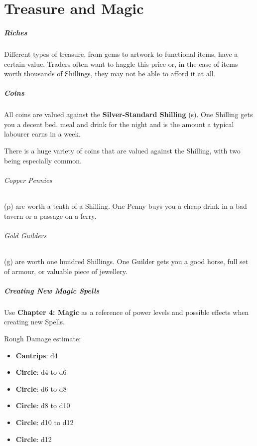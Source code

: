 \documentclass[itdr]{subfiles}
\begin{document}
\chapter{Treasure and Magic}
\label{ch:treasure_and_magic}

\paragraph{Riches}
Different types of treasure, from gems to artwork to functional items, have a certain value. Traders often want to haggle this price or, in the case of items worth thousands of Shillings, they may not be able to afford it at all.

\paragraph{Coins}
All coins are valued against the \textbf{Silver-Standard Shilling} (s). One Shilling gets you a decent bed, meal and drink for the night and is the amount a typical labourer earns in a week.

There is a huge variety of coins that are valued against the Shilling, with two being especially common.

\subparagraph{Copper Pennies} (p) are worth a tenth of a Shilling. One Penny buys you a cheap drink in a bad tavern or a passage on a ferry.

\subparagraph{Gold Guilders} (g) are worth one hundred Shillings. One Guilder gets you a good horse, full set of armour, or valuable piece of jewellery.

\vfill

\paragraph{Creating New Magic Spells}
Use \textbf{Chapter 4: Magic} as a reference of power levels and possible effects when creating new Spells.

Rough Damage estimate:
\begin{itemize}
	\item \textbf{Cantrips}: d4
	\item \textbf{ Circle}: d4 to d6
	\item \textbf{ Circle}: d6 to d8
	\item \textbf{ Circle}: d8 to d10
	\item \textbf{ Circle}: d10 to d12
	\item \textbf{ Circle}: d12
\end{itemize}
\end{document}
